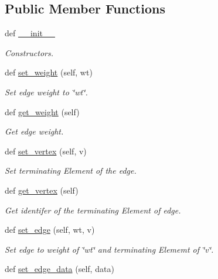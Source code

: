 \subsection*{Public Member Functions}
\begin{DoxyCompactItemize}
\item 
def \hyperlink{classbridges_1_1edge_1_1_edge_aafbac2adad409525c0fc55191fb7cfa8}{\+\_\+\+\_\+init\+\_\+\+\_\+}
\begin{DoxyCompactList}\small\item\em Constructors. \end{DoxyCompactList}\item 
def \hyperlink{classbridges_1_1edge_1_1_edge_ac8dfd60ebfa380ac02b6e9fd8bcb13a1}{set\+\_\+weight} (self, wt)
\begin{DoxyCompactList}\small\item\em Set edge weight to \char`\"{}wt\char`\"{}. \end{DoxyCompactList}\item 
def \hyperlink{classbridges_1_1edge_1_1_edge_a4ba1468a54909bf92ab3cd125f5929b3}{get\+\_\+weight} (self)
\begin{DoxyCompactList}\small\item\em Get edge weight. \end{DoxyCompactList}\item 
def \hyperlink{classbridges_1_1edge_1_1_edge_aba4adfc7164d409a02b8a65af9c5df50}{set\+\_\+vertex} (self, v)
\begin{DoxyCompactList}\small\item\em Set terminating Element of the edge. \end{DoxyCompactList}\item 
def \hyperlink{classbridges_1_1edge_1_1_edge_a1c1978781d77f24f76dbdd7dc95e8e9f}{get\+\_\+vertex} (self)
\begin{DoxyCompactList}\small\item\em Get identifer of the terminating Element of edge. \end{DoxyCompactList}\item 
def \hyperlink{classbridges_1_1edge_1_1_edge_a04f1233833cb134ee88a51d9e348450c}{set\+\_\+edge} (self, wt, v)
\begin{DoxyCompactList}\small\item\em Set edge to weight of \char`\"{}wt\char`\"{} and terminating Elememt of \char`\"{}v\char`\"{}. \end{DoxyCompactList}\item 
def \hyperlink{classbridges_1_1edge_1_1_edge_ad417d82a7b7277f3529667e1e2b280e9}{set\+\_\+edge\+\_\+data} (self, data)

\end{DoxyCompactItemize}
